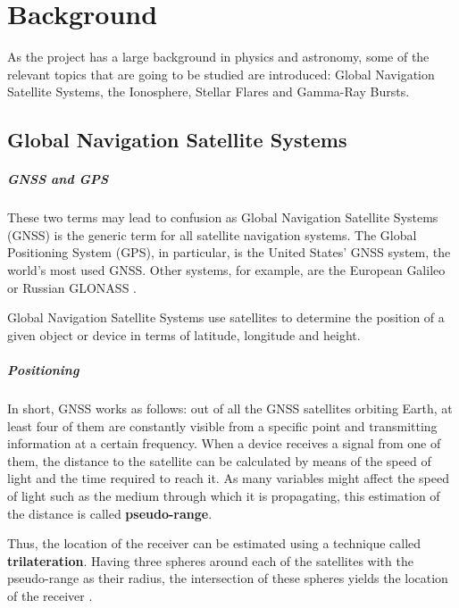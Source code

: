 \chapter{Background}

As the project has a large background in physics and astronomy, some of the relevant topics that are going to be studied are introduced: Global Navigation Satellite Systems, the Ionosphere, Stellar Flares and Gamma-Ray Bursts.

\section{Global Navigation Satellite Systems}

\paragraph{GNSS and GPS}

These two terms may lead to confusion as Global Navigation Satellite Systems (GNSS) is the generic term for all satellite navigation systems. The Global Positioning System (GPS), in particular, is the United States' GNSS system, the world's most used GNSS. Other systems, for example, are the European Galileo or Russian GLONASS \cite{hegarty2008evolution}.

Global Navigation Satellite Systems use satellites to determine the position of a given object or device in terms of latitude, longitude and height. 

\paragraph{Positioning}

In short, GNSS works as follows: out of all the GNSS satellites orbiting Earth, at least four of them are constantly visible from a specific point and transmitting information at a certain frequency. When a device receives a signal from one of them, the distance to the satellite can be calculated by means of the speed of light and the time required to reach it. As many variables might affect the speed of light such as the medium through which it is propagating, this estimation of the distance is called \textbf{pseudo-range}. 

Thus, the location of the receiver can be estimated using a technique called \textbf{trilateration}. Having three spheres around each of the satellites with the pseudo-range as their radius, the intersection of these spheres yields the location of the receiver \cite{hofmann2007gnss}. 

